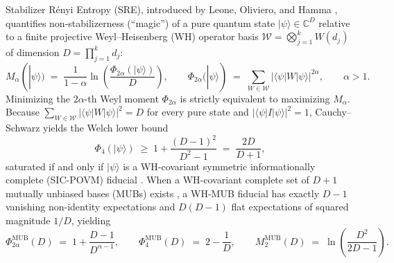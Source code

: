 \documentclass[11pt,reqno]{amsart}
\theoremstyle{definition}
\newcommand{\C}{\mathbb{C}}
\begin{document}
Stabilizer R\'enyi Entropy (SRE), introduced by Leone, Oliviero, and Hamma
\cite{Leone2022SRE}, quantifies non-stabilizerness (``magic'') of a pure quantum state
$|\psi\rangle\in\C^D$ relative to a finite projective Weyl--Heisenberg (WH) operator
basis $\mathcal{W}=\bigotimes_{j=1}^k W(d_j)$ of dimension $D=\prod_{j=1}^k d_j$:
\begin{equation}\label{eq:sre}
  M_\alpha(|\psi\rangle)
  \;=\;
  \frac{1}{1-\alpha}\ln\!\left(\frac{\Phi_{2\alpha}(|\psi\rangle)}{D}\right),
  \qquad
  \Phi_{2\alpha}(|\psi\rangle)
  \;=\;
  \sum_{W\in\mathcal{W}} \bigl|\langle\psi|W|\psi\rangle\bigr|^{2\alpha},
  \qquad \alpha > 1.
\end{equation}
Minimizing the $2\alpha$-th Weyl moment $\Phi_{2\alpha}$ is strictly equivalent to
maximizing $M_\alpha$. Because $\sum_{W\in\mathcal{W}}|\langle\psi|W|\psi\rangle|^2=D$
for every pure state and $|\langle\psi|I|\psi\rangle|^2=1$, Cauchy--Schwarz yields the
Welch lower bound
\begin{equation}\label{eq:welch}
  \Phi_4(|\psi\rangle) \;\ge\; 1 + \frac{(D-1)^2}{D^2-1} \;=\; \frac{2D}{D+1},
\end{equation}
saturated if and only if $|\psi\rangle$ is a WH-covariant symmetric informationally
complete (SIC-POVM) fiducial \cite{Zauner2011QuantumDesigns,Zhu2010SIC}. When a
WH-covariant complete set of $D+1$ mutually unbiased bases (MUBs) exists
\cite{Wootters1989MUB,Bandyopadhyay2002MUB,Klappenecker2004MUB}, a WH-MUB fiducial has
exactly $D-1$ vanishing non-identity expectations and $D(D-1)$ flat expectations of
squared magnitude $1/D$, yielding
\begin{equation}\label{eq:mub-moments}
  \Phi_{2\alpha}^{\mathrm{MUB}}(D) \;=\; 1 + \frac{D-1}{D^{\alpha-1}},
  \qquad
  \Phi_4^{\mathrm{MUB}}(D) \;=\; 2 - \frac{1}{D},
  \qquad
  M_2^{\mathrm{MUB}}(D) \;=\; \ln\!\left(\frac{D^2}{2D-1}\right).
\end{equation}
\end{document}
